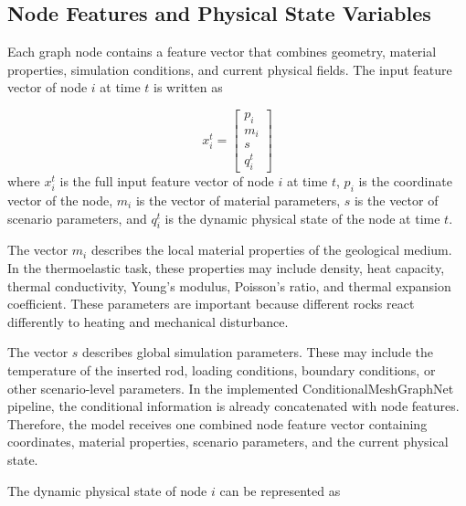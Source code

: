 \subsection{Node Features and Physical State Variables}

Each graph node contains a feature vector that combines geometry, material properties, simulation conditions, and current physical fields. The input feature vector of node \(i\) at time \(t\) is written as

\begin{equation}
x_i^t =
\begin{bmatrix}
p_i \\
m_i \\
s \\
q_i^t
\end{bmatrix}
\end{equation}
where \(x_i^t\) is the full input feature vector of node \(i\) at time \(t\), \(p_i\) is the coordinate vector of the node, \(m_i\) is the vector of material parameters, \(s\) is the vector of scenario parameters, and \(q_i^t\) is the dynamic physical state of the node at time \(t\).

The vector \(m_i\) describes the local material properties of the geological medium. In the thermoelastic task, these properties may include density, heat capacity, thermal conductivity, Young's modulus, Poisson's ratio, and thermal expansion coefficient. These parameters are important because different rocks react differently to heating and mechanical disturbance.

The vector \(s\) describes global simulation parameters. These may include the temperature of the inserted rod, loading conditions, boundary conditions, or other scenario-level parameters. In the implemented ConditionalMeshGraphNet pipeline, the conditional information is already concatenated with node features. Therefore, the model receives one combined node feature vector containing coordinates, material properties, scenario parameters, and the current physical state.

The dynamic physical state of node \(i\) can be represented as

